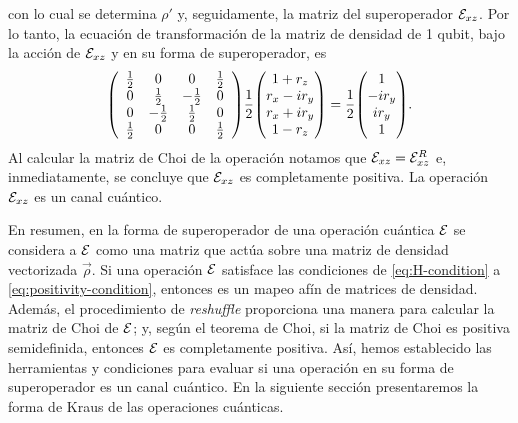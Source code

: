 con lo cual se determina $\rho'$ y, seguidamente,
la matriz del superoperador $\mathcal{E}_{xz}$.
Por lo tanto, la ecuación de transformación de la matriz 
de densidad de 1 qubit, bajo la acción de $\mathcal{E}_{xz}$ y 
en su forma de superoperador, es
\begin{align}
\mqty(
\begin{array}{cccc}
\frac{1}{2} & 0 & 0 & \frac{1}{2} \\
0 & \frac{1}{2} & -\frac{1}{2} & 0 \\
0 & -\frac{1}{2} & \frac{1}{2} & 0 \\
\frac{1}{2} & 0 & 0 & \frac{1}{2} \\
\end{array}
)
\frac{1}{2}
\mqty(
1+r_z\\r_x-ir_y\\r_x+ir_y\\1-r_z
)
=
\frac{1}{2}
\mqty(
1\\-ir_y\\ir_y\\1
).
\label{eq:QC-ex2-SR}
\end{align}
Al calcular la matriz de Choi de la operación notamos 
que $\mathcal{E}_{xz}=\mathcal{E}_{xz}^R$ e, inmediatamente, se concluye
que $\mathcal{E}_{xz}$ es completamente positiva. La operación $\mathcal{E}_{xz}$
es un canal cuántico.

En resumen, en la forma de superoperador de una operación cuántica $\mathcal{E}$
se considera a $\mathcal{E}$ como una matriz que actúa sobre 
una matriz de densidad vectorizada $\vec{\rho}$. 
Si una operación $\mathcal{E}$ satisface las condiciones de
\eqref{eq:H-condition} a \eqref{eq:positivity-condition}, entonces
es un mapeo afín de matrices de densidad.
Además, el procedimiento de \textit{reshuffle} 
proporciona una manera para calcular la matriz de Choi de
 $\mathcal{E}$; y, según el teorema de Choi, si 
la matriz de Choi es positiva semidefinida, entonces $\mathcal{E}$ es 
completamente positiva. 
Así, hemos establecido las herramientas y condiciones para evaluar 
si una operación en su forma de superoperador es un canal cuántico.
En la siguiente sección presentaremos la forma de Kraus de las operaciones
cuánticas.

